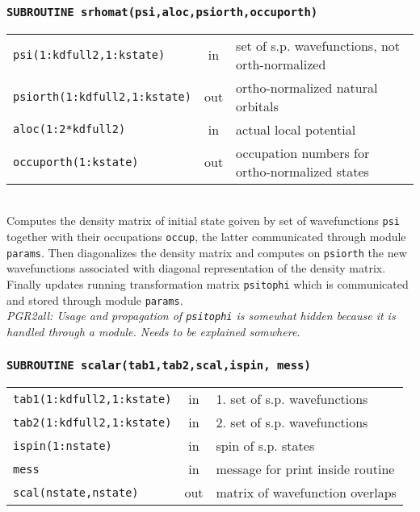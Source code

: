 \documentclass[final,1p]{elsarticle}
\newcommand{\PGRcomm}[1]{{\color{blue}\small\em PGR2all: #1}}
\begin{document}
\subsubsection*{\tt SUBROUTINE srhomat(psi,aloc,psiorth,occuporth)}
\begin{tabular}{lcl}
 {\tt psi(1:kdfull2,1:kstate)} & in & set of s.p. wavefunctions, not orth-normalized\\
 {\tt psiorth(1:kdfull2,1:kstate)} & out & ortho-normalized natural orbitals\\
 {\tt aloc(1:2*kdfull2)} & in & actual local potential\\
 {\tt occuporth(1:kstate)} & out & occupation numbers for
 ortho-normalized states\\
\end{tabular}
\\[4pt] Computes the density matrix of initial state goiven by set of
wavefunctions {\tt psi} together with their occupations {\tt occup},
the latter communicated through module {\tt params}.  Then
diagonalizes the density matrix and computes on {\tt psiorth} the new
wavefunctions associated with diagonal representation of the density
matrix.  
\\
Finally updates running transformation matrix {\tt psitophi} which is
communicated and stored through module {\tt params}.
\\
\PGRcomm{Usage and propagation of  {\tt psitophi} is somewhat hidden
  because it is handled through a module. Needs to be explained somwhere.}


\subsubsection*{\tt SUBROUTINE scalar(tab1,tab2,scal,ispin, mess)}
\begin{tabular}{lcl}
 {\tt tab1(1:kdfull2,1:kstate)} & in & 1. set of s.p. wavefunctions\\
 {\tt tab2(1:kdfull2,1:kstate)} & in & 2. set of s.p. wavefunctions\\
 {\tt ispin(1:nstate)} & in & spin of s.p. states\\
 {\tt mess} & in & message for print inside routine\\
 {\tt scal(nstate,nstate)} & out & matrix of wavefunction overlaps\\
\end{tabular}
\\[4pt]
\end{document}

